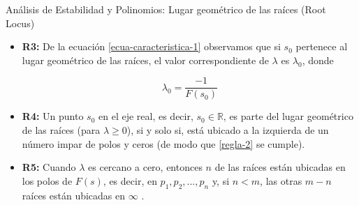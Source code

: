 \documentclass{beamer}
\begin{document}
\begin{frame}{Análisis de Estabilidad y Polinomios: Lugar geométrico de las raíces (Root Locus)}
\begin{justify}

\begin{itemize}
    \justifying
    \item \textbf{R3:} De la ecuación \ref{ecua-caracteristica-1}  observamos que si $s_0$ pertenece al lugar geométrico de las raíces, el valor correspondiente de $\lambda$ es $\lambda_0$, donde

    {\footnotesize
    \begin{equation}\label{lambda-cero}
        \lambda_0 = \frac{-1}{F(s_0)}
    \end{equation}
    }

    \vspace{0.3cm}
    \item \textbf{R4:} Un punto $s_0$ en el eje real, es decir, $s_0 \in \mathbb{R}$, es parte del lugar geométrico de las raíces (para $\lambda \geq 0$), si y solo si, está ubicado a la izquierda de un número impar de polos y ceros (de modo que \ref{regla-2} se cumple).

    \vspace{0.3cm}
    \item \textbf{R5:} Cuando $\lambda$ es cercano a cero, entonces $n$ de las raíces están ubicadas en los polos de $F(s)$, es decir, en $p_1, p_2,... ,p_n$ y, si $n< m$, las otras ${m} - {n}$ raíces están ubicadas en $ \infty $ .
  
\end{itemize}

\end{justify}
\end{frame}
\end{document}
